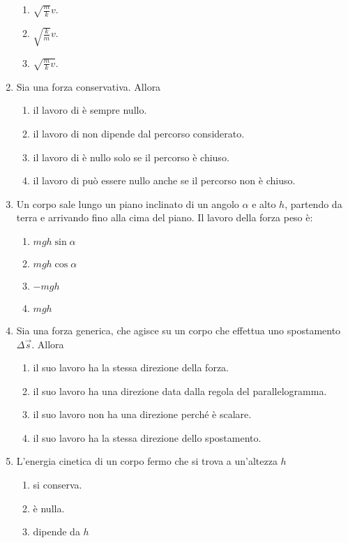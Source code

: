 \documentclass{article}
\begin{document}
\begin{enumerate}
\begin{enumerate}[label=\Alph*.]
    \item $\sqrt{\frac{m}{k}}v$.
    \item $\sqrt{\frac{k}{m}}v$.
    \item $\sqrt{\frac{m}{k}v}$.
  \end{enumerate}
  \item Sia  una forza conservativa. Allora
  \begin{enumerate}[label=\Alph*.]
    \item il lavoro di  è sempre nullo.
    \item il lavoro di  non dipende dal percorso considerato.
    \item il lavoro di  è nullo solo se il percorso è chiuso.
    \item il lavoro di  può essere nullo anche se il percorso non è chiuso.
  \end{enumerate}
  \item Un corpo sale lungo un piano inclinato di un angolo $\alpha$ e alto $h$, partendo da terra e arrivando fino alla cima del piano. Il lavoro della forza peso è:
  \begin{enumerate}[label=\Alph*.]
    \item $mgh\sin\alpha$
    \item $mgh\cos\alpha$
    \item $-mgh$
    \item $mgh$
  \end{enumerate}
  \item Sia  una forza generica, che agisce su un corpo che effettua uno spostamento $\Delta \vec{s}$. Allora
  \begin{enumerate}[label=\Alph*.]
    \item il suo lavoro ha la stessa direzione della forza.
    \item il suo lavoro ha una direzione data dalla regola del parallelogramma.
    \item il suo lavoro non ha una direzione perché è scalare.
    \item il suo lavoro ha la stessa direzione dello spostamento.
  \end{enumerate}
  \item L'energia cinetica di un corpo fermo che si trova a un'altezza $h$
  \begin{enumerate}[label=\Alph*.]
    \item si conserva.
    \item è nulla.
    \item dipende da $h$

\end{enumerate}
\end{enumerate}
\end{document}
